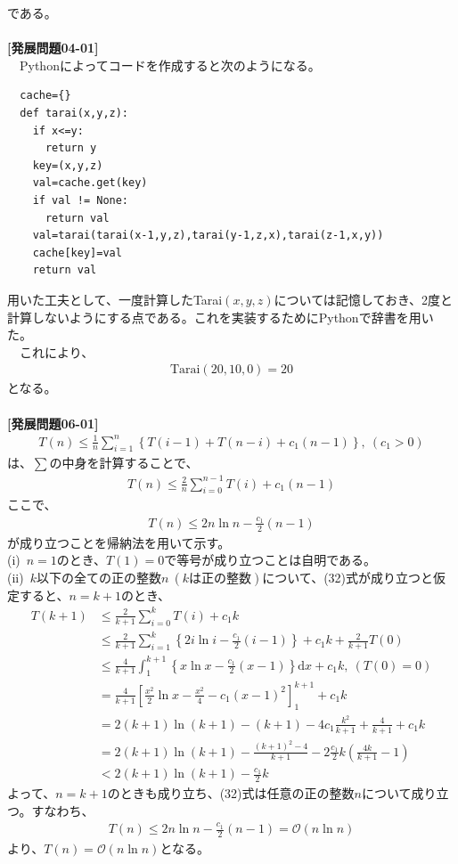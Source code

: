 \documentclass[a4paper,10.5pt]{ltjsarticle}
\begin{document}
である。\\
\\
{\large\bfseries [発展問題04-01]}\\
　Pythonによってコードを作成すると次のようになる。
\begin{lstlisting}
  cache={}
  def tarai(x,y,z):
    if x<=y:
      return y
    key=(x,y,z)
    val=cache.get(key)
    if val != None:
      return val
    val=tarai(tarai(x-1,y,z),tarai(y-1,z,x),tarai(z-1,x,y))
    cache[key]=val
    return val
\end{lstlisting}
用いた工夫として、一度計算したTarai$(x,y,z)$については記憶しておき、2度と計算しないようにする点である。これを実装するためにPythonで辞書を用いた。\\
　これにより、
\begin{align*}
  \mathrm{Tarai}(20,10,0)=20
\end{align*}
となる。\\
\\
{\large\bfseries [発展問題06-01]}\\
\begin{align*}
  T(n)\leq\frac{1}{n}\sum^{n}_{i=1}\left\{T(i-1)+T(n-i)+c_1(n-1)\right\},\ (c_1>0)
\end{align*}
は、$\sum$の中身を計算することで、
\begin{align}
  T(n)\leq\frac{2}{n}\sum^{n-1}_{i=0}T(i)+c_1(n-1)
\end{align}
ここで、
\begin{align}
  T(n)\leq2n\ln{n}-\frac{c_1}{2}(n-1)
\end{align}
が成り立つことを帰納法を用いて示す。\\
(i)\ $n=1$のとき、$T(1)=0$で等号が成り立つことは自明である。\\
(ii)\ $k$以下の全ての正の整数$n\ (kは正の整数)$について、(32)式が成り立つと仮定すると、$n=k+1$のとき、
\begin{align}
  T(k+1)&\leq\frac{2}{k+1}\sum^{k}_{i=0}T(i)+c_1k\nonumber\\[5pt]
  &\leq\frac{2}{k+1}\sum^{k}_{i=1}\left\{2i\ln{i}-\frac{c_1}{2}(i-1)\right\}+c_1k+\frac{2}{k+1}T(0)\nonumber\\[5pt]
  &\leq\frac{4}{k+1}\int^{k+1}_{1}\left\{x\ln{x}-\frac{c_1}{2}(x-1)\right\}\mathrm{d}x+c_1k,\ (T(0)=0)\nonumber\\[5pt]
  &=\frac{4}{k+1}\left[\frac{x^2}{2}\ln{x}-\frac{x^2}{4}-c_1(x-1)^2\right]^{k+1}_1+c_1k\nonumber\\[5pt]
  &=2(k+1)\ln(k+1)-(k+1)-4c_1\frac{k^2}{k+1}+\frac{4}{k+1}+c_1k\nonumber\\[5pt]
  &=2(k+1)\ln(k+1)-\frac{(k+1)^2-4}{k+1}-2\frac{c_1}{2}k\left(\frac{4k}{k+1}-1\right)\nonumber\\[5pt]
  &<2(k+1)\ln(k+1)-\frac{c_1}{2}k
\end{align}
よって、$n=k+1$のときも成り立ち、(32)式は任意の正の整数$n$について成り立つ。すなわち、
\begin{align*}
  T(n)\leq2n\ln{n}-\frac{c_1}{2}(n-1)=\mathcal{O}(n\ln{n})
\end{align*}
より、$T(n)=\mathcal{O}(n\ln{n})$となる。
\end{document}
